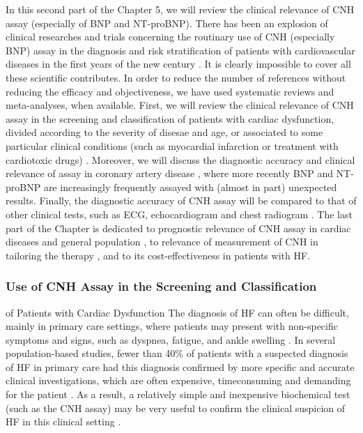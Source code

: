 \documentclass[14pt,a4paper,onecolumn]{extarticle}
\begin{document}
In this second part of the Chapter 5, we will review the clinical relevance of CNH assay
(especially of BNP and NT-proBNP). There has been an explosion of clinical researches and trials concerning the routinary use of CNH (especially BNP) assay in the diagnosis and risk stratification of patients with cardiovascular diseases in the first years of
the new century . It is clearly impossible to cover all these scientific contributes. In order to reduce the number of references
without reducing the efficacy and objectiveness, we have used systematic reviews and
meta-analyses, when available.
First, we will review the clinical relevance of CNH assay in the screening and classification of patients with cardiac dysfunction, divided according to the severity of disesae and age, or associated to some particular clinical conditions (such as myocardial
infarction or treatment with cardiotoxic drugs) . Moreover, we will discuss the diagnostic accuracy and clinical relevance of assay in coronary artery disease , where more recently BNP and NT-proBNP are increasingly frequently assayed with (almost in part) unexpected results. Finally, the diagnostic accuracy of CNH assay will be compared to that of other clinical tests, such as ECG,
echocardiogram and chest radiogram .
The last part of the Chapter is dedicated to prognostic relevance of CNH assay in
cardiac diseases and general population , to relevance of
measurement of CNH in tailoring the therapy , and to its cost-effectiveness  in patients with HF.

\subsubsection{ Use of CNH Assay in the Screening and Classification}

of Patients with Cardiac Dysfunction
The diagnosis of HF can often be difficult, mainly in primary care settings, where
patients may present with non-specific symptoms and signs, such as dyspnea, fatigue,
and ankle swelling \citep{bib368} \citep{bib369} \citep{bib370}. In several population-based studies, fewer than 40\% of
patients with a suspected diagnosis of HF in primary care had this diagnosis confirmed
by more specific and accurate clinical investigations, which are often expensive, timeconsuming and demanding for the patient \citep{bib368} \citep{bib369} \citep{bib370} \citep{bib3104} \citep{bib3105}. As a result, a relatively simple and inexpensive biochemical test (such as the CNH assay) may be very useful to
confirm the clinical suspicion of HF in this clinical setting \citep{bib35} \citep{bib334} \citep{bib335}.
\end{document}
